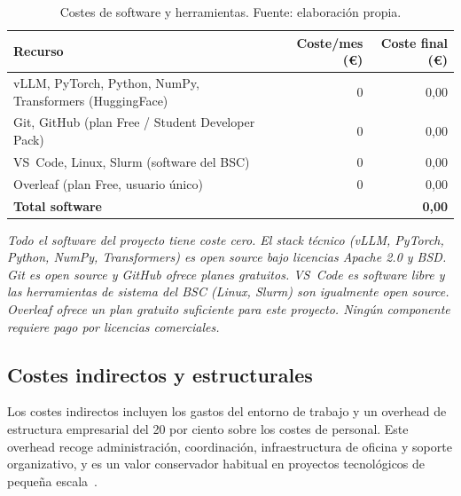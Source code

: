 \begin{table}[H]
\centering
\caption{Costes de software y herramientas. Fuente: elaboración propia.}
\label{tab:software}
\footnotesize
\begin{tabular}{l r r}
\toprule
\textbf{Recurso} & \textbf{Coste/mes (\euro{})} & \textbf{Coste final (\euro{})} \\
\midrule
vLLM, PyTorch, Python, NumPy, Transformers (HuggingFace) & 0 & 0,00 \\
Git, GitHub (plan Free / Student Developer Pack)         & 0 & 0,00 \\
VS~Code, Linux, Slurm (software del BSC)                 & 0 & 0,00 \\
Overleaf (plan Free, usuario único)                      & 0 & 0,00 \\
\midrule
\textbf{Total software} & & \textbf{0,00} \\
\bottomrule
\end{tabular}
\end{table}

\noindent\textit{\scriptsize Todo el software del proyecto tiene coste cero. El stack técnico (vLLM, PyTorch, Python, NumPy, Transformers) es open source bajo licencias Apache 2.0 y BSD. Git es open source y GitHub ofrece planes gratuitos. VS~Code es software libre y las herramientas de sistema del BSC (Linux, Slurm) son igualmente open source. Overleaf ofrece un plan gratuito suficiente para este proyecto. Ningún componente requiere pago por licencias comerciales.}

\subsection{Costes indirectos y estructurales}

Los costes indirectos incluyen los gastos del entorno de trabajo y un overhead de estructura empresarial del 20 por ciento sobre los costes de personal. Este overhead recoge administración, coordinación, infraestructura de oficina y soporte organizativo, y es un valor conservador habitual en proyectos tecnológicos de pequeña escala~\cite{pmbok}.

